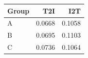 \begin{tabular}{lrr}
\toprule
Group & T2I & I2T\\
\midrule
A & 0.0668 & 0.1058 \\
B & 0.0695 & 0.1103 \\
C & 0.0736 & 0.1064 \\
\bottomrule
\end{tabular}
